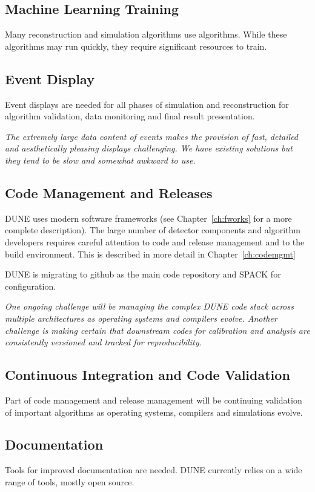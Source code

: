 \documentclass[../main-v1.tex]{subfiles}
\begin{document}
\subsection{Machine Learning Training} 
Many reconstruction and simulation algorithms use  algorithms.  While these algorithms may run quickly, they   require significant resources to train.  

\subsection{Event Display}
Event displays are needed for all phases of simulation and reconstruction for algorithm validation, data monitoring and final result presentation. 

{\it The extremely large data content of  events makes the provision of fast, detailed and aesthetically pleasing displays challenging.  We have existing solutions but they tend to be slow and somewhat awkward to use.}

\subsection{Code Management and Releases}
DUNE  uses modern software frameworks (see Chapter~\ref{ch:fworks} for a more complete description). The large number of detector components and algorithm developers requires careful attention to code and release management and to the build environment.  This is described in more detail in Chapter~\ref{ch:codemgmt}

DUNE is migrating to github as the main code repository and SPACK for configuration.  

{\it One ongoing challenge will be managing the complex DUNE code stack across multiple architectures as operating systems and compilers evolve. Another challenge is making certain that downstream codes for calibration and analysis are consistently versioned and tracked for reproducibility.} 

\subsection{Continuous Integration and Code Validation}

Part of code management and release management will be continuing validation of important algorithms as operating systems, compilers and simulations evolve. 



\subsection{Documentation}
Tools for improved documentation are needed. DUNE currently relies on a wide range of tools, mostly open source.
\end{document}
